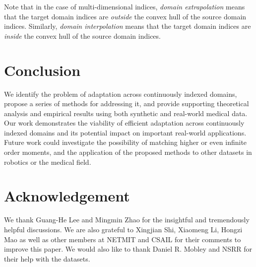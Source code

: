 \documentclass{article}
\begin{document}
Note that in the case of multi-dimensional indices, \emph{domain extrapolation} means that the target domain indices are \emph{outside} the convex hull of the source domain indices. Similarly, \emph{domain interpolation} means that the target domain indices are \emph{inside} the convex hull of the source domain indices.  \section{Conclusion}
We identify the problem of adaptation across continuously indexed domains, propose a series of methods for addressing it, and provide supporting theoretical analysis and empirical results using both synthetic and real-world medical data. Our work demonstrates the viability of efficient adaptation across continuously indexed domains and its potential impact on important real-world applications. Future work could investigate the possibility of matching higher or even infinite order moments, and the application of the proposed methods to other datasets in robotics or the medical field.  
\section*{Acknowledgement}
We thank Guang-He Lee and Mingmin Zhao for the insightful and tremendously helpful discussions. We are also grateful to Xingjian Shi, Xiaomeng Li, Hongzi Mao as well as other members at NETMIT and CSAIL for their comments to improve this paper. We would also like to thank Daniel R. Mobley and NSRR for their help with the datasets. 




\end{document}
